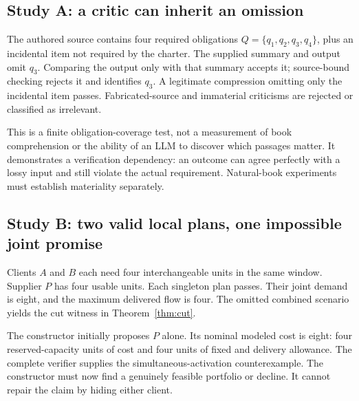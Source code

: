 \documentclass[11pt,a4paper]{article}
\begin{document}
\subsection{Study A: a critic can inherit an omission}
The authored source contains four required obligations $Q=\{q_1,q_2,q_3,q_4\}$, plus an incidental item not required by the charter. The supplied summary and output omit $q_3$. Comparing the output only with that summary accepts it; source-bound checking rejects it and identifies $q_3$. A legitimate compression omitting only the incidental item passes. Fabricated-source and immaterial criticisms are rejected or classified as irrelevant.

This is a finite obligation-coverage test, not a measurement of book comprehension or the ability of an LLM to discover which passages matter. It demonstrates a verification dependency: an outcome can agree perfectly with a lossy input and still violate the actual requirement. Natural-book experiments must establish materiality separately.

\subsection{Study B: two valid local plans, one impossible joint promise}
Clients $A$ and $B$ each need four interchangeable units in the same window. Supplier $P$ has four usable units. Each singleton plan passes. Their joint demand is eight, and the maximum delivered flow is four. The omitted combined scenario yields the cut witness in Theorem~\ref{thm:cut}.

The constructor initially proposes $P$ alone. Its nominal modeled cost is eight: four reserved-capacity units of cost and four units of fixed and delivery allowance. The complete verifier supplies the simultaneous-activation counterexample. The constructor must now find a genuinely feasible portfolio or decline. It cannot repair the claim by hiding either client.
\end{document}
